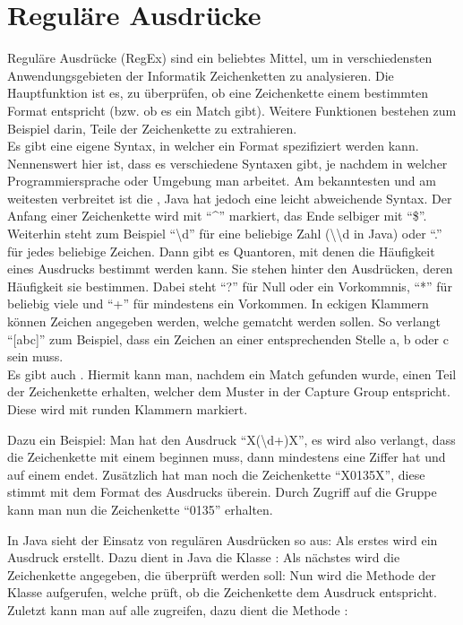 \section{Reguläre Ausdrücke}

Reguläre Ausdrücke (RegEx) sind ein beliebtes Mittel, um in verschiedensten Anwendungsgebieten der Informatik Zeichenketten zu analysieren.
Die Hauptfunktion ist es, zu überprüfen, ob eine Zeichenkette einem bestimmten Format entspricht (bzw. ob es ein Match gibt).
Weitere Funktionen bestehen zum Beispiel darin, Teile der Zeichenkette zu extrahieren.\\

Es gibt eine eigene Syntax, in welcher ein Format spezifiziert werden kann\cite{regex101}.
Nennenswert hier ist, dass es verschiedene Syntaxen gibt, je nachdem in welcher Programmiersprache oder Umgebung man arbeitet.
Am bekanntesten und am weitesten verbreitet ist die , Java hat jedoch eine leicht abweichende Syntax.
Der Anfang einer Zeichenkette wird mit \enquote{\textasciicircum} markiert, das Ende selbiger mit \enquote{\$}.
Weiterhin steht zum Beispiel \enquote{\textbackslash d} für eine beliebige Zahl (\textbackslash\textbackslash d in Java) oder \enquote{.} für jedes beliebige Zeichen.
Dann gibt es Quantoren, mit denen die Häufigkeit eines Ausdrucks bestimmt werden kann.
Sie stehen hinter den Ausdrücken, deren Häufigkeit sie bestimmen.
Dabei steht \enquote{?} für Null oder ein Vorkommnis, \enquote{*} für beliebig viele und \enquote{+} für mindestens ein Vorkommen.
In eckigen Klammern können Zeichen angegeben werden, welche gematcht werden sollen. So verlangt \enquote{[abc]} zum Beispiel, dass ein Zeichen an einer entsprechenden Stelle a, b oder c sein muss.\\

Es gibt auch . Hiermit kann man, nachdem ein Match gefunden wurde, einen Teil der Zeichenkette erhalten, welcher dem Muster in der Capture Group entspricht. Diese wird mit runden Klammern markiert.

Dazu ein Beispiel: Man hat den Ausdruck \enquote{X(\textbackslash d+)X}, es wird also verlangt, dass die Zeichenkette mit einem  beginnen muss, dann mindestens eine Ziffer hat und auf einem  endet. 
Zusätzlich hat man noch die Zeichenkette \enquote{X0135X}, diese stimmt mit dem Format des Ausdrucks überein.
Durch Zugriff auf die Gruppe kann man nun die Zeichenkette \enquote{0135} erhalten.

In Java sieht der Einsatz von regulären Ausdrücken so aus:
Als erstes wird ein Ausdruck erstellt. Dazu dient in Java die Klasse :
\noindent Als nächstes wird die Zeichenkette angegeben, die überprüft werden soll:
\noindent Nun wird die Methode  der Klasse  aufgerufen, welche prüft, ob die Zeichenkette dem Ausdruck entspricht.
\noindent Zuletzt kann man auf alle  zugreifen, dazu dient die Methode :
